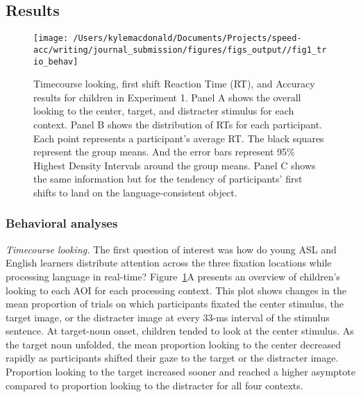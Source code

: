 \documentclass[,man,floatsintext]{apa6}
\begin{document}
\hypertarget{results}{%
\subsection{Results}\label{results}}

\begin{figure}[!t]

{\centering \texttt{[image: /Users/kylemacdonald/Documents/Projects/speed-acc/writing/journal\_submission/figures/figs\_output//fig1\_trio\_behav]} 

}

\caption{Timecourse looking, first shift Reaction Time (RT), and Accuracy results for children in Experiment 1. Panel A shows the overall looking to the center, target, and distracter stimulus for each context. Panel B shows the distribution of RTs for each participant. Each point represents a participant's average RT. The black squares represent the group means. And the error bars represent 95\% Highest Density Intervals around the group means. Panel C shows the same information but for the tendency of participants' first shifts to land on the language-consistent object.}\label{fig:speed-acc-trio-plot}
\end{figure}

\hypertarget{behavioral-analyses}{%
\subsubsection{Behavioral analyses}\label{behavioral-analyses}}

\emph{Timecourse looking.} The first question of interest was how do
young ASL and English learners distribute attention across the three
fixation locations while processing language in real-time?
Figure~\ref{fig:speed-acc-trio-plot}A presents an overview of children's
looking to each AOI for each processing context. This plot shows changes
in the mean proportion of trials on which participants fixated the
center stimulus, the target image, or the distracter image at every
33-ms interval of the stimulus sentence. At target-noun onset, children
tended to look at the center stimulus. As the target noun unfolded, the
mean proportion looking to the center decreased rapidly as participants
shifted their gaze to the target or the distracter image. Proportion
looking to the target increased sooner and reached a higher asymptote
compared to proportion looking to the distracter for all four contexts.
\end{document}
